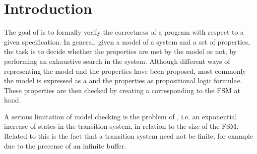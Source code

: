 \newpage
\section{Introduction}
The goal of  is to formally verify the correctness of a program with respect to a given specification. In general, given a model of a system and a set of properties, the task is to decide whether the properties are met by the model or not, by performing an exhaustive search in the system. Although different ways of representing the model and the properties have been proposed, most commonly the model is expressed as a  and the properties as propositional logic formulae. These properties are then checked by creating a  corresponding to the FSM at hand.

A serious limitation of model checking is the problem of , i.e. an exponential increase of states in the transition system, in relation to the size of the FSM. Related to this is the fact that a transition system need not be finite, for example due to the precense of an infinite buffer.

